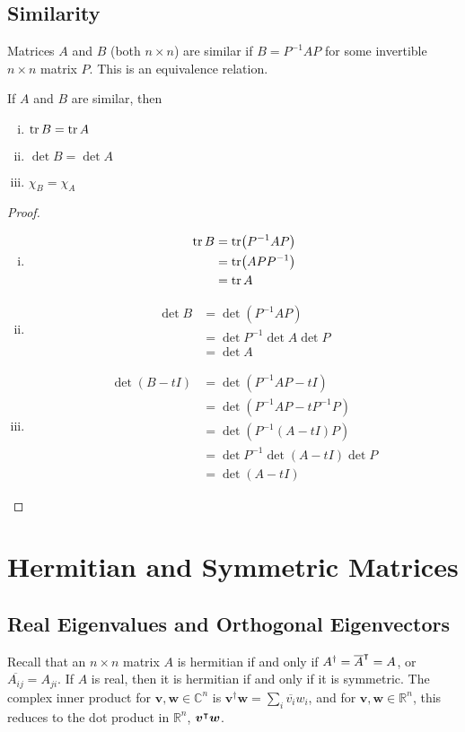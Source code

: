 \documentclass{article}
\begin{document}
	\subsection{Similarity}
	Matrices $A$ and $B$ (both $n \times n$) are similar if $B = P^{-1}AP$ for some invertible $n\times n$ matrix $P$. This is an equivalence relation.
	\begin{proposition}
		If $A$ and $B$ are similar, then
		\begin{enumerate}[(i)]
			\item $\tr B = \tr A$
			\item $\det B = \det A$
			\item $\chi_B = \chi_A$
		\end{enumerate}
	\end{proposition}
	\begin{proof}
		\begin{enumerate}[(i)]
			\item \begin{align*}
				\tr B &= \tr (P^{-1}AP) \\&= \tr(APP^{-1}) \\&= \tr A
			\end{align*}
			\item \begin{align*}
				\det B &= \det (P^{-1}AP) \\&= \det P^{-1} \det A \det P \\&= \det A
			\end{align*}
			\item \begin{align*}
				\det(B - tI) &= \det(P^{-1}AP - tI) \\&= \det(P^{-1}AP - tP^{-1}P) \\&= \det(P^{-1}(A - tI)P) \\&= \det P^{-1} \det(A - tI) \det P \\&= \det(A - tI)
			\end{align*}
		\end{enumerate}
	\end{proof}

	\section{Hermitian and Symmetric Matrices}
	\subsection{Real Eigenvalues and Orthogonal Eigenvectors}
	Recall that an $n\times n$ matrix $A$ is hermitian if and only if $A^\dagger = \overline{A}^\intercal = A$, or $\overline{A_{ij}} = A_{ji}$. If $A$ is real, then it is hermitian if and only if it is symmetric. The complex inner product for $\bm v, \bm w \in \mathbb C^n$ is $\bm v^\dagger \bm w = \sum_i \overline{v_i}w_i$, and for $\bm v, \bm w \in \mathbb R^n$, this reduces to the dot product in $\mathbb R^n$, $\bm v^\intercal \bm w$.
\end{document}
